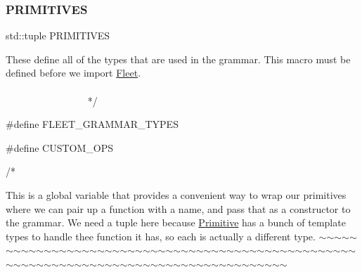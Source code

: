 \mbox{\label{_formal_language_theory-_complex_2_main_8cpp_a04e6d8e4b74d3f4fc965e5e5449158a3}} 
\subsubsection{\texorpdfstring{P\+R\+I\+M\+I\+T\+I\+V\+ES}{PRIMITIVES}}
{\footnotesize\ttfamily std\+::tuple P\+R\+I\+M\+I\+T\+I\+V\+ES}


\begin{DoxyCode}
    These define all of the types that are used in the grammar.
    This macro must be defined before we \textcolor{keyword}{import} \hyperlink{namespace_fleet}{Fleet}.
   ~~~~~~~~~~~~~~~~~~~~~~~~~~~~~~~~~~~~~~~~~~~~~~~~~~~~~~~~~~~~~~~~~~~~~~~~~~~~~~~~~~~~~~~~ */

\textcolor{preprocessor}{#define FLEET\_GRAMMAR\_TYPES}

\textcolor{preprocessor}{#define CUSTOM\_OPS}

\textcolor{comment}{/*}
\end{DoxyCode}
 This is a global variable that provides a convenient way to wrap our primitives where we can pair up a function with a name, and pass that as a constructor to the grammar. We need a tuple here because \hyperlink{struct_primitive}{Primitive} has a bunch of template types to handle thee function it has, so each is actually a different type. $\sim$$\sim$$\sim$$\sim$$\sim$$\sim$$\sim$$\sim$$\sim$$\sim$$\sim$$\sim$$\sim$$\sim$$\sim$$\sim$$\sim$$\sim$$\sim$$\sim$$\sim$$\sim$$\sim$$\sim$$\sim$$\sim$$\sim$$\sim$$\sim$$\sim$$\sim$$\sim$$\sim$$\sim$$\sim$$\sim$$\sim$$\sim$$\sim$$\sim$$\sim$$\sim$$\sim$$\sim$$\sim$$\sim$$\sim$$\sim$$\sim$$\sim$$\sim$$\sim$$\sim$$\sim$$\sim$$\sim$$\sim$$\sim$$\sim$$\sim$$\sim$$\sim$$\sim$$\sim$$\sim$$\sim$$\sim$$\sim$$\sim$$\sim$$\sim$$\sim$$\sim$$\sim$$\sim$$\sim$$\sim$$\sim$$\sim$$\sim$$\sim$$\sim$$\sim$$\sim$$\sim$$\sim$$\sim$$\sim$ \mbox{\label{_formal_language_theory-_complex_2_main_8cpp_a2806650ae26591d113cbc7f3d5184387}} 
